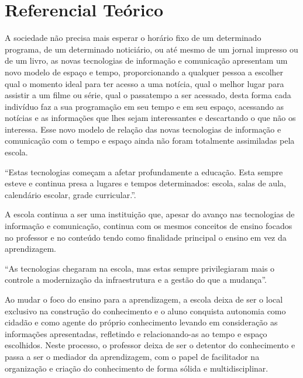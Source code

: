 \documentclass[12pt, openright, a4paper, brazil, english, french, spanish, bibjustif, openany, oneside]{abntex2}
\begin{document}
\chapter{Referencial Teórico}

A sociedade não precisa mais esperar o horário fixo de um determinado programa, de um determinado noticiário, ou até mesmo de um jornal impresso ou de um livro, as novas tecnologias de informação e comunicação apresentam um novo modelo de espaço e tempo, proporcionando a qualquer pessoa a escolher qual o momento ideal para ter acesso a uma notícia, qual o melhor lugar para assistir a um filme ou série, qual o passatempo a ser acessado, desta forma cada indivíduo faz a sua programação em seu tempo e em seu espaço, acessando as notícias e as informações que lhes sejam interessantes e descartando o que não os interessa. Esse novo modelo de relação das novas tecnologias de informação e comunicação com o tempo e espaço ainda não foram totalmente assimiladas pela escola.

\begin{citacao}

``Estas tecnologias começam a afetar profundamente a educação. Esta sempre esteve e continua presa a lugares e tempos determinados: escola, salas de aula, calendário escolar, grade curricular.''\cite{moran}.

\end{citacao}


A escola continua a ser uma instituição que, apesar do avanço nas tecnologias de informação e comunicação, continua com os mesmos conceitos de ensino focados no professor e no conteúdo tendo como finalidade principal o ensino em vez da aprendizagem. 

\begin{citacao}

``As tecnologias chegaram na escola, mas estas sempre privilegiaram mais o controle a modernização da infraestrutura e a gestão do que a mudança''\cite{moran}.

\end{citacao}

Ao mudar o foco do ensino para a aprendizagem, a escola deixa de ser o local exclusivo na construção do conhecimento e o aluno conquista autonomia como cidadão e como agente do próprio conhecimento levando em consideração as informações apresentadas, refletindo e relacionando-as ao tempo e espaço escolhidos. Neste processo, o professor deixa de ser o detentor do conhecimento e passa a ser o mediador da aprendizagem, com o papel de facilitador na organização e criação do conhecimento de forma sólida e multidisciplinar. 
\end{document}
